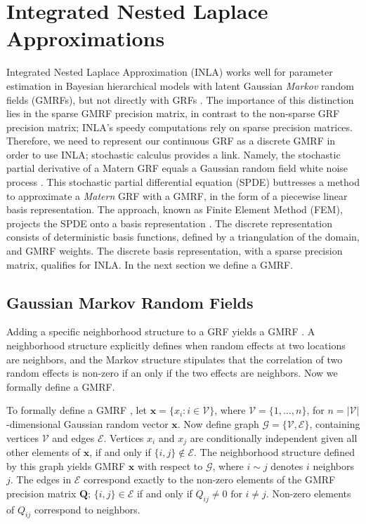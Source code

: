 \section{Integrated Nested Laplace Approximations} \label{INLA} %
Integrated Nested Laplace Approximation (INLA) works well for parameter estimation in Bayesian hierarchical models with latent Gaussian {\it Markov} random fields (GMRFs), but not directly with GRFs \citep{Rue2007}. The importance of this distinction lies in the sparse GMRF precision matrix, in contrast to the non-sparse GRF precision matrix; INLA's speedy computations rely on sparse precision matrices. Therefore, we need to represent our continuous GRF as a discrete GMRF in order to use INLA; stochastic calculus provides a link. Namely, the stochastic partial derivative of a Matern GRF equals a Gaussian random field white noise process \citep{Lindgren2011}. This stochastic partial differential equation (SPDE) buttresses a method to approximate a {\it Matern} GRF with a GMRF, in the form of a piecewise linear basis representation. The approach, known as Finite Element Method (FEM), projects the SPDE onto a basis representation \citep{Dhatt2012}. The discrete representation consists of deterministic basis functions, defined by a triangulation of the domain, and GMRF weights. The discrete basis representation, with a sparse precision matrix, qualifies for INLA. In the next section we define a GMRF.


\subsection{Gaussian Markov Random Fields}

Adding a specific neighborhood structure to a GRF yields a GMRF \citep{Rue2007}. A neighborhood structure explicitly defines when random effects at two locations are neighbors, and the Markov structure stipulates that the correlation of two random effects is non-zero if an only if the two effects are neighbors. Now we formally define a GMRF.

To formally define a GMRF \citep{Rue2007}, let $\pmb{x} = \{ x_{i}:i \in \mathscr{V} \}$, where $\mathscr{V} = \{1,\dots,n\}$, for $n = |\mathscr{V}|$-dimensional Gaussian random vector $\pmb{x}$. Now define graph $\mathscr{G} = \{ \mathscr{V}, \mathscr{E} \}$, containing vertices $\mathscr{V}$ and edges $\mathscr{E}$. Vertices $x_{i}$ and $x_{j}$ are conditionally independent given all other elements of $\pmb{x}$, if and only if $\{i, j\} \notin \mathscr{E}$. The neighborhood structure defined by this graph yields GMRF $\pmb{x}$ with respect to $\mathscr{G}$, where $i \sim j$ denotes $i$ neighbors $j$. The edges in $\mathscr{E}$ correspond exactly to the non-zero elements of the GMRF precision matrix $\pmb{Q}$; $\{ i, j \} \in \mathscr{E}$ if and only if $Q_{ij} \neq 0 \text{ for } i \neq j$. Non-zero elements of $Q_{ij}$ correspond to neighbors.

